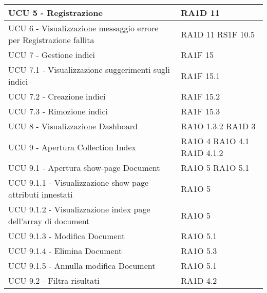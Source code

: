 \begin{center}
\begin{longtable}{ | p{5cm} | p{5cm} |}
						UCU 5 - Registrazione &  RA1D 11 \newline  \\ \hline      
						UCU 6 - Visualizzazione messaggio errore per Registrazione fallita &  RA1D 11 \newline  RS1F 10.5 \newline  \\ \hline      
						UCU 7 - Gestione indici &  RA1F 15 \newline  \\ \hline      
						UCU 7.1 - Visualizzazione suggerimenti sugli indici &  RA1F 15.1 \newline  \\ \hline      
						UCU 7.2 - Creazione indici &  RA1F 15.2 \newline  \\ \hline      
						UCU 7.3  - Rimozione indici &  RA1F 15.3 \newline  \\ \hline      
						UCU 8 - Visualizzazione Dashboard &  RA1O 1.3.2 \newline  RA1D 3 \newline  \\ \hline      
						UCU 9 - Apertura Collection Index &  RA1O 4 \newline  RA1O 4.1 \newline  RA1D 4.1.2 \newline  \\ \hline      
						UCU 9.1 - Apertura show-page Document &  RA1O 5 \newline  RA1O 5.1 \newline  \\ \hline      
						UCU 9.1.1 - Visualizzazione show page attributi innestati &  RA1O 5 \newline  \\ \hline      
						UCU 9.1.2 - Visualizzazione index page dell'array di document &  RA1O 5 \newline  \\ \hline      
						UCU 9.1.3 - Modifica Document &  RA1O 5.1 \newline  \\ \hline      
						UCU 9.1.4 - Elimina Document &  RA1O 5.3 \newline  \\ \hline      
						UCU 9.1.5 - Annulla modifica Document &  RA1O 5.1 \newline  \\ \hline      
						UCU 9.2 - Filtra risultati &  RA1D 4.2 \newline  \\ \hline      

\end{longtable}
\end{center}

